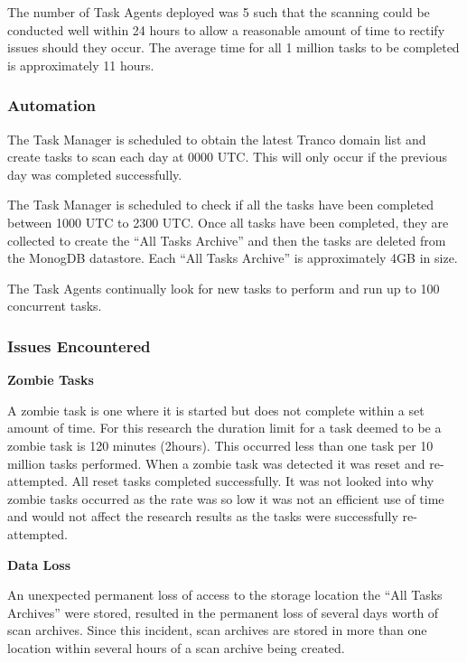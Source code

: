 \documentclass{mscreport}
\begin{document}
\vspace{0.3cm} \noindent
The number of Task Agents deployed was 5 such that the scanning could be conducted well within 24 hours to allow a reasonable amount of time to rectify issues should they occur. The average time for all 1 million tasks to be completed is approximately 11 hours.

\subsubsection{Automation}

The Task Manager is scheduled to obtain the latest Tranco domain list and create tasks to scan each day at 0000 UTC. This will only occur if the previous day was completed successfully.

\vspace{0.3cm} \noindent
The Task Manager is scheduled to check if all the tasks have been completed between 1000 UTC to 2300 UTC. Once all tasks have been completed, they are collected to create the ``All Tasks Archive'' and then the tasks are deleted from the MonogDB datastore. Each ``All Tasks Archive'' is approximately 4GB in size.

\vspace{0.3cm} \noindent
The Task Agents continually look for new tasks to perform and run up to 100 concurrent tasks.

\subsubsection{Issues Encountered}

\textbf{Zombie Tasks}

\vspace{0.2cm} \noindent
A zombie task is one where it is started but does not complete within a set amount of time. For this research the duration limit for a task deemed to be a zombie task is 120 minutes (2hours). This occurred less than one task per 10 million tasks performed. When a zombie task was detected it was reset and re-attempted. All reset tasks completed successfully. It was not looked into why zombie tasks occurred as the rate was so low it was not an efficient use of time and would not affect the research results as the tasks were successfully re-attempted.

\vspace{0.6cm} \noindent
\textbf{Data Loss}

\vspace{0.2cm} \noindent
An unexpected permanent loss of access to the storage location the ``All Tasks Archives'' were stored, resulted in the permanent loss of several days worth of scan archives. Since this incident, scan archives are stored in more than one location within several hours of a scan archive being created.
\end{document}
